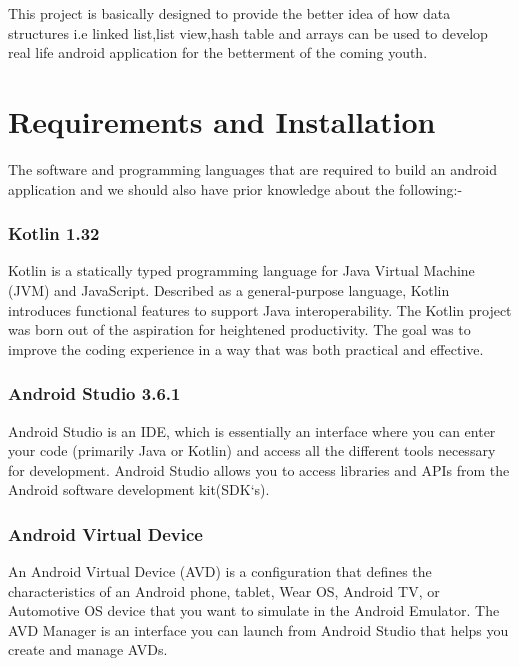 \documentclass[11pt,a4paper]{report}
\begin{document}
This project is basically designed to provide the better idea of how data structures i.e linked list,list view,hash table and arrays can be used to develop real life android application for the betterment of 
the coming youth.
\vskip 30cm



\chapter{Requirements and Installation}
	
The software and programming languages that are required to build an android application and we should also have prior knowledge about the following:-

\subsection*{\Large{Kotlin 1.32}}

Kotlin is a statically typed programming language for Java Virtual Machine (JVM) and JavaScript. Described as a general-purpose language, Kotlin introduces functional features to support Java
 interoperability. The Kotlin project was born out of the aspiration for heightened productivity. The goal was to improve the coding experience in a way that was both practical and effective.

\subsection*{\Large{Android Studio 3.6.1}}

Android Studio is an IDE, which is essentially an interface where you can enter your code (primarily Java or Kotlin) and access all the different tools necessary for development. 
Android Studio allows you to access libraries and APIs from the Android software development kit(SDK`s).

\subsection*{\Large{Android Virtual Device}}

An Android Virtual Device (AVD) is a configuration that defines the characteristics of an Android phone, tablet, Wear OS, Android TV, or Automotive OS device that you want to simulate in
 the Android Emulator. The AVD Manager is an interface you can launch from Android Studio that helps you create and manage AVDs.
\end{document}
